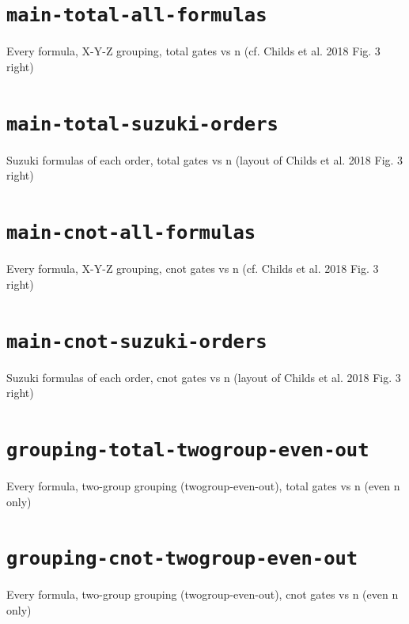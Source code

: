 \documentclass{article}
\begin{document}
\section*{\texttt{main-total-all-formulas}}
Every formula, X-Y-Z grouping, total gates vs n (cf. Childs et al. 2018 Fig. 3 right)\par\medskip

\clearpage

\section*{\texttt{main-total-suzuki-orders}}
Suzuki formulas of each order, total gates vs n (layout of Childs et al. 2018 Fig. 3 right)\par\medskip

\clearpage

\section*{\texttt{main-cnot-all-formulas}}
Every formula, X-Y-Z grouping, cnot gates vs n (cf. Childs et al. 2018 Fig. 3 right)\par\medskip

\clearpage

\section*{\texttt{main-cnot-suzuki-orders}}
Suzuki formulas of each order, cnot gates vs n (layout of Childs et al. 2018 Fig. 3 right)\par\medskip

\clearpage

\section*{\texttt{grouping-total-twogroup-even-out}}
Every formula, two-group grouping (twogroup-even-out), total gates vs n (even n only)\par\medskip

\clearpage

\section*{\texttt{grouping-cnot-twogroup-even-out}}
Every formula, two-group grouping (twogroup-even-out), cnot gates vs n (even n only)\par\medskip

\clearpage
\end{document}
